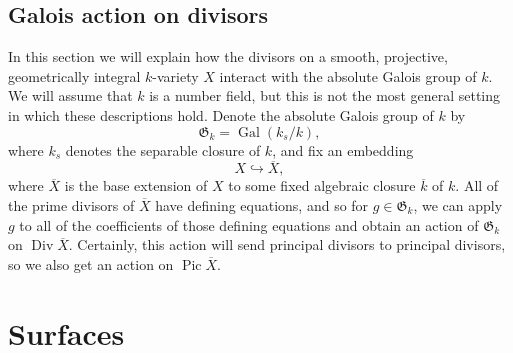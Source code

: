 \documentclass[12pt,twoside]{reedthesis}
\theoremstyle{plain}
\theoremstyle{definition}
\theoremstyle{remark}
\newcommand{\Div}{\operatorname{Div}}
\newcommand{\Pic}{\operatorname{Pic}}
\newcommand{\Gal}{\operatorname{Gal}}
\newcommand{\GG}{\mathfrak{G}}
\begin{document}
\subsection{Galois action on divisors}
In this section we will explain how the divisors on a smooth, projective, geometrically integral $k$-variety $X$ interact with the absolute Galois group of $k$. We will assume that $k$ is a number field, but this is not the most general setting in which these descriptions hold. Denote the absolute Galois group of $k$ by
\[
\GG_k=\Gal(k_s/k),
\]
where $k_s$ denotes the separable closure of $k$, and fix an embedding
\[
X\hookrightarrow \overline{X},
\]
where $\overline{X}$ is the base extension of $X$ to some fixed algebraic closure $\overline{k}$ of $k$. All of the prime divisors of $\overline{X}$ have defining equations, and so for $g\in\GG_k$, we can apply $g$ to all of the coefficients of those defining equations and obtain an action of $\GG_k$ on $\Div\overline{X}$. Certainly, this action will send principal divisors to principal divisors, so we also get an action on $\Pic \overline{X}$.
\section{Surfaces}
\end{document}
